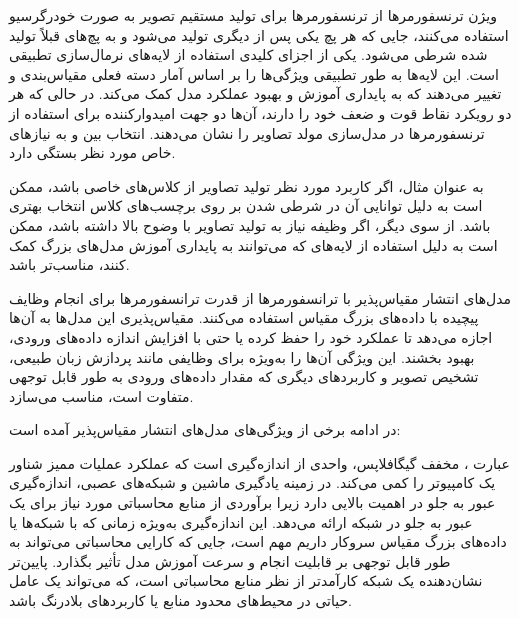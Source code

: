 ویژن ترنسفورمرها از ترنسفورمرها برای تولید مستقیم تصویر به صورت خودرگرسیو استفاده می‌کنند، جایی که هر پچ یکی پس از دیگری تولید می‌شود و به پچ‌های قبلاً تولید شده شرطی می‌شود. یکی از اجزای کلیدی  استفاده از لایه‌های نرمال‌سازی تطبیقی است. این لایه‌ها به طور تطبیقی ویژگی‌ها را بر اساس آمار دسته فعلی مقیاس‌بندی و تغییر می‌دهند که به پایداری آموزش و بهبود عملکرد مدل کمک می‌کند. در حالی که هر دو رویکرد نقاط قوت و ضعف خود را دارند، آن‌ها دو جهت امیدوارکننده برای استفاده از ترنسفورمرها در مدل‌سازی مولد تصاویر را نشان می‌دهند. انتخاب بین  و  به نیازهای خاص مورد نظر بستگی دارد.

به عنوان مثال، اگر کاربرد مورد نظر تولید تصاویر از کلاس‌های خاصی باشد،  ممکن است به دلیل توانایی آن در شرطی شدن بر روی برچسب‌های کلاس انتخاب بهتری باشد. از سوی دیگر، اگر وظیفه نیاز به تولید تصاویر با وضوح بالا داشته باشد،  ممکن است به دلیل استفاده از لایه‌های  که می‌توانند به پایداری آموزش مدل‌های بزرگ کمک کنند، مناسب‌تر باشد.








مدل‌های انتشار مقیاس‌پذیر با ترانسفورمرها از قدرت ترانسفورمرها برای انجام وظایف پیچیده با داده‌های بزرگ مقیاس استفاده می‌کنند. مقیاس‌پذیری این مدل‌ها به آن‌ها اجازه می‌دهد تا عملکرد خود را حفظ کرده یا حتی با افزایش اندازه داده‌های ورودی، بهبود بخشند. این ویژگی آن‌ها را به‌ویژه برای وظایفی مانند پردازش زبان طبیعی، تشخیص تصویر و کاربردهای دیگری که مقدار داده‌های ورودی به طور قابل توجهی متفاوت است، مناسب می‌سازد.

در ادامه برخی از ویژگی‌های مدل‌های انتشار مقیاس‌پذیر آمده است:


عبارت ، مخفف گیگافلاپس، واحدی از اندازه‌گیری است که عملکرد عملیات ممیز شناور یک کامپیوتر را کمی می‌کند. در زمینه یادگیری ماشین و شبکه‌های عصبی، اندازه‌گیری عبور به جلو در  اهمیت بالایی دارد زیرا برآوردی از منابع محاسباتی مورد نیاز برای یک عبور به جلو در شبکه ارائه می‌دهد. این اندازه‌گیری به‌ویژه زمانی که با شبکه‌ها یا داده‌های بزرگ مقیاس سروکار داریم مهم است، جایی که کارایی محاسباتی می‌تواند به طور قابل توجهی بر قابلیت انجام و سرعت آموزش مدل تأثیر بگذارد.  پایین‌تر نشان‌دهنده یک شبکه کارآمدتر از نظر منابع محاسباتی است، که می‌تواند یک عامل حیاتی در محیط‌های محدود منابع یا کاربردهای بلادرنگ باشد.













